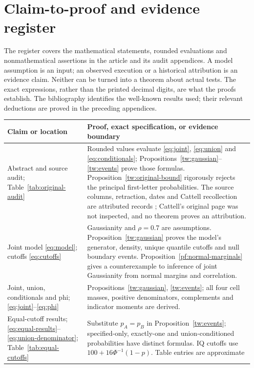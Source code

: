 \chapter{Claim-to-proof and evidence register}
\label{sec:towers-claim-map}
The register covers the mathematical statements, rounded evaluations and
nonmathematical assertions in the article and its audit appendices. A model
assumption is an input; an observed execution or a historical attribution is
an evidence claim. Neither can be turned into a theorem about actual tests.
The exact expressions, rather than the printed decimal digits, are what the
proofs establish. The bibliography identifies the well-known results used;
their relevant deductions are proved in the preceding appendices.

\small
\begin{longtable}{>{\raggedright\arraybackslash}p{.28\linewidth}>{\raggedright\arraybackslash}p{.65\linewidth}}
\toprule
Claim or location & Proof, exact specification, or evidence boundary\\
\midrule\endhead
Abstract and source audit; Table~\ref{tab:original-audit}
& Rounded values evaluate \eqref{eq:joint}, \eqref{eq:union} and
\eqref{eq:conditionals}; Propositions~\ref{tw:gaussian}--\ref{tw:events}
prove those formulas. Proposition~\ref{tw:original-bound} rigorously rejects
the principal first-letter probabilities. The source columns, retraction,
dates and Cattell recollection are attributed records
\citep{towersOriginal,towersFollowup}; Cattell's original page was not
inspected, and no theorem proves an attribution.\\
Joint model \eqref{eq:model}; cutoffs \eqref{eq:cutoffs}
& Gaussianity and \(\rho=0.7\) are assumptions. Proposition~\ref{tw:gaussian}
proves the model's generator, density, unique quantile cutoffs and null
boundary events. Proposition~\ref{pf:normal-marginals} gives a counterexample
to inference of joint Gaussianity from normal margins and correlation.\\
Joint, union, conditionals and phi; \eqref{eq:joint}--\eqref{eq:phi}
& Propositions~\ref{tw:gaussian}, \ref{tw:events}; all four cell masses,
positive denominators, complements and indicator moments are derived.\\
Equal-cutoff results; \eqref{eq:equal-results}--\eqref{eq:union-denominator};
Table~\ref{tab:equal-cutoffs}
& Substitute \(p_A=p_B\) in Proposition~\ref{tw:events}; specified-only,
exactly-one and union-conditioned probabilities have distinct formulas.
IQ cutoffs use \(100+16\Phi^{-1}(1-p)\). Table entries are approximate

\end{longtable}
